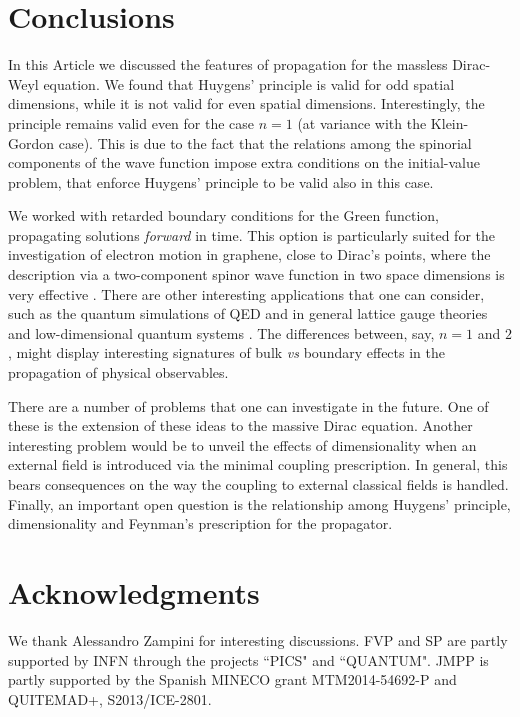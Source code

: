 \section{Conclusions}
\label{sec:nplus1}
In this Article we discussed the features of propagation for the massless Dirac-Weyl equation. We found that Huygens' principle is valid for odd spatial dimensions, while it is not valid for even spatial dimensions. 
Interestingly, the principle remains valid even for the case $n = 1$ (at variance with the Klein-Gordon case). This is due to the fact that the relations among the spinorial components of the wave function impose extra conditions on the initial-value problem, that enforce Huygens' principle to be valid also in this case.

We worked with retarded boundary conditions for the Green function, propagating solutions \emph{forward} in time. This option is particularly suited for the investigation of electron motion in graphene, close to Dirac's points, where the description via a two-component spinor wave function in two space dimensions is very effective \cite{graphene_rev,graphene_nat}. 
There are other interesting applications that one can consider, such as the quantum simulations of QED and in general lattice gauge theories and low-dimensional quantum systems \cite{qsim1,qsim2,qsim3,qsim4}. The differences between, say, $n=1$ and $2$, might display interesting signatures of bulk \emph{vs} boundary effects in the propagation of physical observables.

There are a number of problems that one can investigate in the future. One of these is the extension of these ideas to the massive Dirac equation. Another interesting problem would be to unveil the effects of dimensionality when an external field is introduced via the minimal coupling prescription. In general, this bears consequences on the way the coupling to external classical fields is handled. Finally, an important open question is the relationship among Huygens' principle, dimensionality and Feynman's prescription for the propagator. 


\section*{Acknowledgments}
We thank Alessandro Zampini for interesting discussions.
FVP and SP are partly supported by INFN through the projects ``PICS" and ``QUANTUM". 
JMPP is partly supported by the Spanish MINECO grant MTM2014-54692-P and QUITEMAD+, S2013/ICE-2801.



